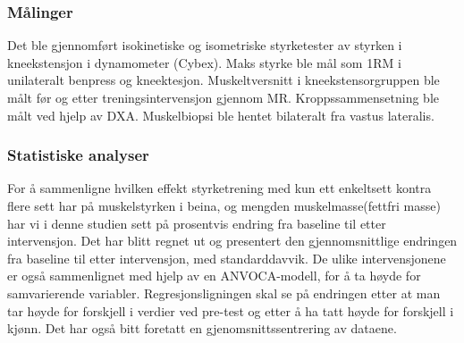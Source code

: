 \documentclass[
]{book}
\begin{document}
\hypertarget{muxe5linger}{%
\subsubsection{Målinger}\label{muxe5linger}}

Det ble gjennomført isokinetiske og isometriske styrketester av styrken i kneekstensjon i dynamometer (Cybex). Maks styrke ble mål som 1RM i unilateralt benpress og kneektesjon. Muskeltversnitt i kneekstensorgruppen ble målt før og etter treningsintervensjon gjennom MR. Kroppssammensetning ble målt ved hjelp av DXA. Muskelbiopsi ble hentet bilateralt fra vastus lateralis.

\hypertarget{statistiske-analyser}{%
\subsubsection{Statistiske analyser}\label{statistiske-analyser}}

For å sammenligne hvilken effekt styrketrening med kun ett enkeltsett kontra flere sett har på muskelstyrken i beina, og mengden muskelmasse(fettfri masse) har vi i denne studien sett på prosentvis endring fra baseline til etter intervensjon. Det har blitt regnet ut og presentert den gjennomsnittlige endringen fra baseline til etter intervensjon, med standarddavvik. De ulike intervensjonene er også sammenlignet med hjelp av en ANVOCA-modell, for å ta høyde for samvarierende variabler. Regresjonsligningen skal se på endringen etter at man tar høyde for forskjell i verdier ved pre-test og etter å ha tatt høyde for forskjell i kjønn. Det har også bitt foretatt en gjenomsnittssentrering av dataene.

\providecommand{\docline}[3]{\noalign{\global\setlength{\arrayrulewidth}{#1}}\arrayrulecolor[HTML]{#2}\cline{#3}}

\setlength{\tabcolsep}{2pt}

\renewcommand*{\arraystretch}{1.5}
\end{document}
